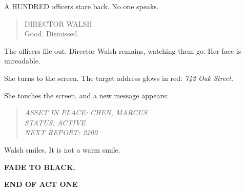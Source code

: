 \documentclass[
    language=english,
    doctype=screenplay,
    institution=none,
]{../../omnilatex}
\begin{document}
A HUNDRED officers stare back. No one speaks.

\begin{quote}
DIRECTOR WALSH\\
Good. Dismissed.
\end{quote}

The officers file out. Director Walsh remains, watching them go. Her face is unreadable.

She turns to the screen. The target address glows in red: \textit{742 Oak Street.}

She touches the screen, and a new message appears:

\begin{quote}
\textit{ASSET IN PLACE: CHEN, MARCUS\\
STATUS: ACTIVE\\
NEXT REPORT: 2200}
\end{quote}

Walsh smiles. It is not a warm smile.

\begin{center}
\textbf{FADE TO BLACK.}
\end{center}

\vspace{1cm}

\begin{center}
\textbf{END OF ACT ONE}
\end{center}
\end{document}
